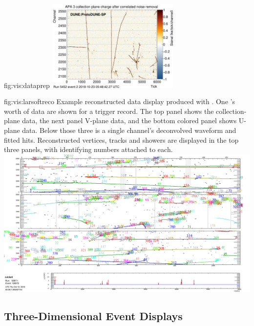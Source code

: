 \documentclass[../main-v1.tex]{subfiles}
\begin{document}
\begin{dunefigure}{fig:vis:dataprep}
\includegraphics[width=0.49\textwidth]{graphics/EventDisplays/adccnr_tpp0z_run005452_evt000002.png}
\end{dunefigure}


\begin{dunefigure}
{fig:vis:larsoftreco} 
{Example reconstructed data display produced with .  One 's worth of data are shown for a  trigger record. The top panel shows the collection-plane data, the next panel V-plane data, and the bottom colored panel shows U-plane data.  Below those three is a single channel's deconvolved waveform and fitted hits.  Reconstructed vertices, tracks and showers are displayed in the top three panels, with identifying numbers attached to each.}
\includegraphics[width=0.9 \textwidth]{graphics/EventDisplays/larsoft_reco_example_evd.png}
\end{dunefigure}


\subsection{Three-Dimensional Event Displays}
\label{sec:visualization:3d}
\end{document}
